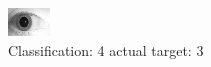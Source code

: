 \begin{figure}[h!]
\begin{center}
\includegraphics[width=0.60\columnwidth]{figures/ID1978_class_4_target_3.png}
\end{center}
\caption{ Classification: 4 actual target: 3}
\label{fig:ID1978_class_4_target_3}
\end{figure}
